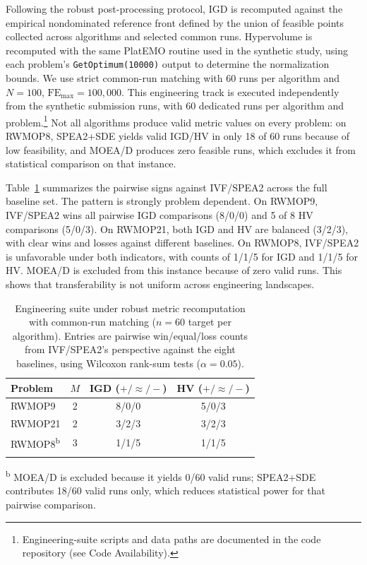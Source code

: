 \documentclass[pdflatex,sn-mathphys-ay]{sn-jnl}%
\theoremstyle{thmstyleone}%
\theoremstyle{thmstyletwo}%
\theoremstyle{thmstylethree}%
\begin{document}
Following the robust post-processing protocol, IGD is recomputed against the empirical nondominated reference front defined by the union of feasible points collected across algorithms and selected common runs. Hypervolume is recomputed with the same PlatEMO routine used in the synthetic study, using each problem's \texttt{GetOptimum(10000)} output to determine the normalization bounds. We use strict common-run matching with 60 runs per algorithm and $N=100$, $\mathrm{FE}_{\max}=100{,}000$. This engineering track is executed independently from the synthetic submission runs, with 60 dedicated runs per algorithm and problem.\footnote{Engineering-suite scripts and data paths are documented in the code repository (see Code Availability).} Not all algorithms produce valid metric values on every problem: on RWMOP8, SPEA2+SDE yields valid IGD/HV in only 18 of 60 runs because of low feasibility, and MOEA/D produces zero feasible runs, which excludes it from statistical comparison on that instance.

Table~\ref{tab:engineering} summarizes the pairwise signs against IVF/SPEA2 across the full baseline set. The pattern is strongly problem dependent. On RWMOP9, IVF/SPEA2 wins all pairwise IGD comparisons (8/0/0) and 5 of 8 HV comparisons (5/0/3). On RWMOP21, both IGD and HV are balanced (3/2/3), with clear wins and losses against different baselines. On RWMOP8, IVF/SPEA2 is unfavorable under both indicators, with counts of 1/1/5 for IGD and 1/1/5 for HV. MOEA/D is excluded from this instance because of zero valid runs. This shows that transferability is not uniform across engineering landscapes.

\begin{table}[t]
	\caption{Engineering suite under robust metric recomputation with common-run matching ($n=60$ target per algorithm). Entries are pairwise win/equal/loss counts from IVF/SPEA2's perspective against the eight baselines, using Wilcoxon rank-sum tests ($\alpha=0.05$).}\label{tab:engineering}
	\centering\small
	\begin{tabular}{lccc}
		\toprule
		Problem                   & $M$ & IGD ($+/\approx/-$) & HV ($+/\approx/-$) \\
		\midrule
		RWMOP9                    & 2   & 8/0/0               & 5/0/3              \\
		RWMOP21                   & 2   & 3/2/3               & 3/2/3              \\
		RWMOP8\textsuperscript{b} & 3   & 1/1/5               & 1/1/5              \\
		\botrule
	\end{tabular}
	\smallskip
	\noindent\textsuperscript{b} MOEA/D is excluded because it yields 0/60 valid runs; SPEA2+SDE contributes 18/60 valid runs only, which reduces statistical power for that pairwise comparison.
\end{table}
\end{document}
